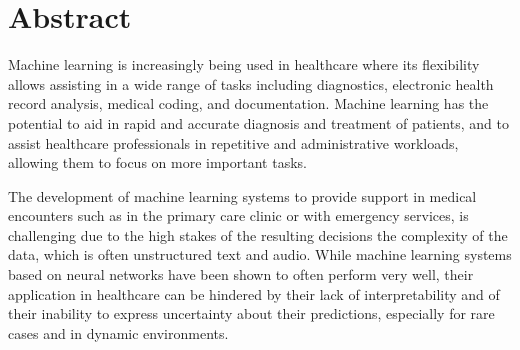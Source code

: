 
\chapter[abstract]{Abstract}

Machine learning is increasingly being used in healthcare where its flexibility allows assisting in a wide range of tasks including diagnostics, electronic health record analysis, medical coding, and documentation. Machine learning has the potential to aid in rapid and accurate diagnosis and treatment of patients, and to assist healthcare professionals in repetitive and administrative workloads, allowing them to focus on more important tasks. 

The development of machine learning systems to provide support in medical encounters such as in the primary care clinic or with emergency services, is challenging due to the high stakes of the resulting decisions the complexity of the data, which is often unstructured text and audio. 
While machine learning systems based on neural networks have been shown to often perform very well, their application in healthcare can be hindered by their lack of interpretability and of their inability to express uncertainty about their predictions, especially for rare cases and in dynamic environments.

